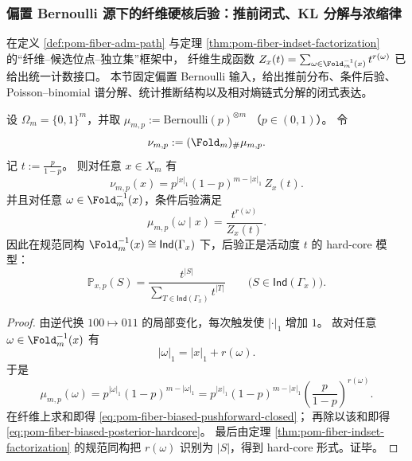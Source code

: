 \subsubsection{偏置 Bernoulli 源下的纤维硬核后验：推前闭式、KL 分解与浓缩律}\label{subsubsec:pom-fiber-biased-bernoulli-hardcore}
在定义 \ref{def:pom-fiber-adm-path} 与定理 \ref{thm:pom-fiber-indset-factorization} 的“纤维--候选位点--独立集”框架中，
纤维生成函数
\(
Z_x(t)=\sum_{\omega\in\Fold_m^{-1}(x)}t^{r(\omega)}
\)
已给出统一计数接口。
本节固定偏置 Bernoulli 输入，给出推前分布、条件后验、Poisson--binomial 谱分解、统计推断结构以及相对熵链式分解的闭式表达。

\begin{theorem}\label{thm:pom-fiber-biased-bernoulli-pushforward-hardcore}
设 \(\Omega_m=\{0,1\}^m\)，并取
\(
\mu_{m,p}:=\mathrm{Bernoulli}(p)^{\otimes m}
\)
（\(p\in(0,1)\)）。
令
\[
\nu_{m,p}:=(\Fold_m)_{\#}\mu_{m,p}.
\]
记
\(
t:=\frac{p}{1-p}
\)。
则对任意 \(x\in X_m\) 有
\begin{equation}\label{eq:pom-fiber-biased-pushforward-closed}
\nu_{m,p}(x)
=
p^{|x|_1}(1-p)^{m-|x|_1}\,Z_x(t).
\end{equation}
并且对任意 \(\omega\in\Fold_m^{-1}(x)\)，条件后验满足
\begin{equation}\label{eq:pom-fiber-biased-posterior-hardcore}
\mu_{m,p}(\omega\mid x)
=
\frac{t^{r(\omega)}}{Z_x(t)}.
\end{equation}
因此在规范同构
\(
\Fold_m^{-1}(x)\cong \mathsf{Ind}(\Gamma_x)
\)
下，后验正是活动度 \(t\) 的 hard-core 模型：
\[
\mathbb P_{x,p}(S)=\frac{t^{|S|}}{\sum_{T\in\mathsf{Ind}(\Gamma_x)}t^{|T|}}
\qquad
\bigl(S\in\mathsf{Ind}(\Gamma_x)\bigr).
\]
\end{theorem}
\begin{proof}
由逆代换 \(100\mapsto 011\) 的局部变化，每次触发使 \(|\cdot|_1\) 增加 \(1\)。
故对任意 \(\omega\in\Fold_m^{-1}(x)\) 有
\[
|\omega|_1=|x|_1+r(\omega).
\]
于是
\[
\mu_{m,p}(\omega)
=p^{|\omega|_1}(1-p)^{m-|\omega|_1}
=p^{|x|_1}(1-p)^{m-|x|_1}\left(\frac{p}{1-p}\right)^{r(\omega)}.
\]
在纤维上求和即得
\eqref{eq:pom-fiber-biased-pushforward-closed}；
再除以该和即得
\eqref{eq:pom-fiber-biased-posterior-hardcore}。
最后由定理 \ref{thm:pom-fiber-indset-factorization} 的规范同构把 \(r(\omega)\) 识别为 \(|S|\)，得到 hard-core 形式。证毕。
\end{proof}

